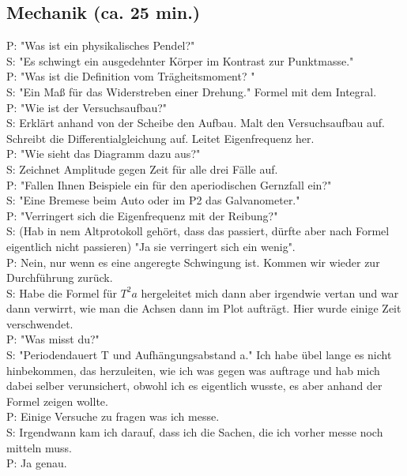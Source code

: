 \documentclass[10pt]{article}
\begin{document}
\begin{multicols}{2}
\section{Mechanik (ca. 25 min.)}
P: "Was ist ein physikalisches Pendel?"\\
S: "Es schwingt ein ausgedehnter Körper im Kontrast zur Punktmasse."\\
P: "Was ist die Definition vom Trägheitsmoment? "\\
S: "Ein Maß für das Widerstreben einer Drehung." Formel mit dem Integral.\\
P: "Wie ist der Versuchsaufbau?"\\
S: Erklärt anhand von der Scheibe den Aufbau. Malt den Versuchsaufbau auf. Schreibt die Differentialgleichung auf. Leitet Eigenfrequenz her.\\
P: "Wie sieht das Diagramm dazu aus?"\\
S: Zeichnet Amplitude gegen Zeit für alle drei Fälle auf.\\
P: "Fallen Ihnen Beispiele ein für den aperiodischen Gernzfall ein?"\\
S: "Eine Bremese beim Auto oder im P2 das Galvanometer."\\
P: "Verringert sich die Eigenfrequenz mit der Reibung?"\\
S: (Hab in nem Altprotokoll gehört, dass das passiert, dürfte aber nach Formel eigentlich nicht passieren) "Ja sie verringert sich ein wenig".\\
P: Nein, nur wenn es eine angeregte Schwingung ist. Kommen wir wieder zur Durchführung zurück.\\
S: Habe die Formel für \(T^2a\) hergeleitet mich dann aber irgendwie vertan und war dann verwirrt, wie man die Achsen dann im Plot aufträgt. Hier wurde einige Zeit verschwendet.\\
P: "Was misst du?"\\
S: "Periodendauert T und Aufhängungsabstand a." Ich habe übel lange es nicht hinbekommen, das herzuleiten, wie ich was gegen was auftrage und hab mich dabei selber verunsichert, obwohl ich es eigentlich wusste, es aber anhand der Formel zeigen wollte.\\
P: Einige Versuche zu fragen was ich messe.\\
S: Irgendwann kam ich darauf, dass ich die Sachen, die ich vorher messe noch mitteln muss.\\
P: Ja genau.\\


\end{multicols}
\end{document}
